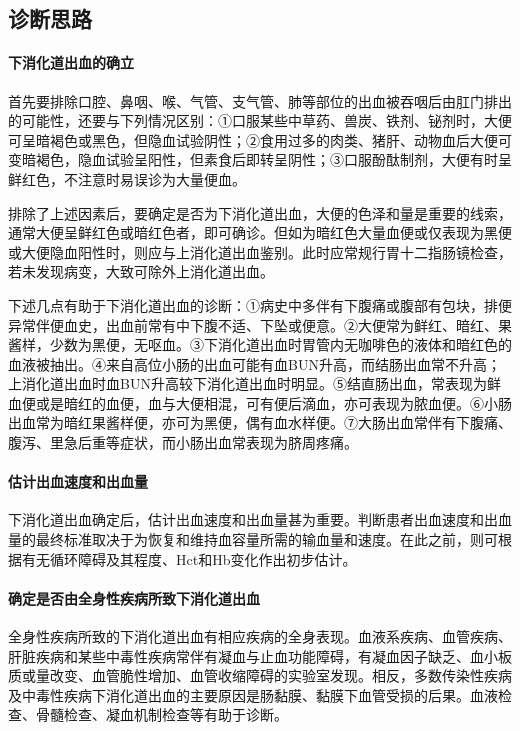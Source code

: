 \subsection{诊断思路}

\paragraph{下消化道出血的确立}

首先要排除口腔、鼻咽、喉、气管、支气管、肺等部位的出血被吞咽后由肛门排出的可能性，还要与下列情况区别：①口服某些中草药、兽炭、铁剂、铋剂时，大便可呈暗褐色或黑色，但隐血试验阴性；②食用过多的肉类、猪肝、动物血后大便可变暗褐色，隐血试验呈阳性，但素食后即转呈阴性；③口服酚酞制剂，大便有时呈鲜红色，不注意时易误诊为大量便血。

排除了上述因素后，要确定是否为下消化道出血，大便的色泽和量是重要的线索，通常大便呈鲜红色或暗红色者，即可确诊。但如为暗红色大量血便或仅表现为黑便或大便隐血阳性时，则应与上消化道出血鉴别。此时应常规行胃十二指肠镜检查，若未发现病变，大致可除外上消化道出血。

下述几点有助于下消化道出血的诊断：①病史中多伴有下腹痛或腹部有包块，排便异常伴便血史，出血前常有中下腹不适、下坠或便意。②大便常为鲜红、暗红、果酱样，少数为黑便，无呕血。③下消化道出血时胃管内无咖啡色的液体和暗红色的血液被抽出。④来自高位小肠的出血可能有血BUN升高，而结肠出血常不升高；上消化道出血时血BUN升高较下消化道出血时明显。⑤结直肠出血，常表现为鲜血便或是暗红的血便，血与大便相混，可有便后滴血，亦可表现为脓血便。⑥小肠出血常为暗红果酱样便，亦可为黑便，偶有血水样便。⑦大肠出血常伴有下腹痛、腹泻、里急后重等症状，而小肠出血常表现为脐周疼痛。

\paragraph{估计出血速度和出血量}

下消化道出血确定后，估计出血速度和出血量甚为重要。判断患者出血速度和出血量的最终标准取决于为恢复和维持血容量所需的输血量和速度。在此之前，则可根据有无循环障碍及其程度、Hct和Hb变化作出初步估计。

\paragraph{确定是否由全身性疾病所致下消化道出血}

全身性疾病所致的下消化道出血有相应疾病的全身表现。血液系疾病、血管疾病、肝脏疾病和某些中毒性疾病常伴有凝血与止血功能障碍，有凝血因子缺乏、血小板质或量改变、血管脆性增加、血管收缩障碍的实验室发现。相反，多数传染性疾病及中毒性疾病下消化道出血的主要原因是肠黏膜、黏膜下血管受损的后果。血液检查、骨髓检查、凝血机制检查等有助于诊断。

